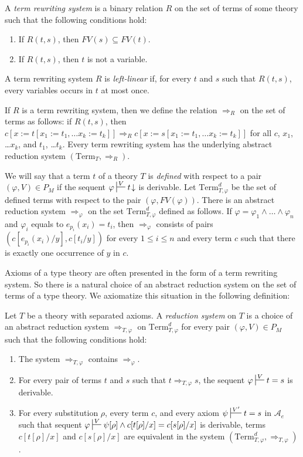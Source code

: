 \documentclass[reqno]{amsart}
\theoremstyle{definition}
\theoremstyle{remark}
\newcommand{\repl}{:=}
\newcommand{\Term}{\mathrm{Term}}
\numberwithin{figure}{section}
\begin{document}
A \emph{term rewriting system} is a binary relation $R$ on the set of terms of some theory such that the following conditions hold:
\begin{enumerate}
\item If $R(t,s)$, then $FV(s) \subseteq FV(t)$.
\item If $R(t,s)$, then $t$ is not a variable.
\end{enumerate}
A term rewriting system $R$ is \emph{left-linear} if, for every $t$ and $s$ such that $R(t,s)$, every variables occurs in $t$ at most once.

If $R$ is a term rewriting system, then we define the relation $\Rightarrow_R$ on the set of terms as follows:
if $R(t,s)$, then $c[x \repl t[x_1 \repl t_1, \ldots x_k \repl t_k]] \Rightarrow_R c[x \repl s[x_1 \repl t_1, \ldots x_k \repl t_k]]$ for all $c$, $x_1$, \ldots $x_k$, and $t_1$, \ldots $t_k$.
Every term rewriting system has the underlying abstract reduction system $(\Term_T,\Rightarrow_R)$.

We will say that a term $t$ of a theory $T$ is \emph{defined} with respect to a pair $(\varphi,V) \in P_M$ if the sequent $\varphi \sststile{}{V} t\!\downarrow$ is derivable.
Let $\Term_{T,\varphi}^d$ be the set of defined terms with respect to the pair $(\varphi,FV(\varphi))$.
There is an abstract reduction system $\Rightarrow_\varphi$ on the set $\Term_{T,\varphi}^d$ defined as follows.
If $\varphi = \varphi_1 \land \ldots \land \varphi_n$ and $\varphi_i$ equals to $e_{p_i}(x_i) = t_i$, then $\Rightarrow_\varphi$ consists of pairs $(c[e_{p_i}(x_i)/y],c[t_i/y])$
for every $1 \leq i \leq n$ and every term $c$ such that there is exactly one occurrence of $y$ in $c$.

Axioms of a type theory are often presented in the form of a term rewriting system.
So there is a natural choice of an abstract reduction system on the set of terms of a type theory.
We axiomatize this situation in the following definition:

\begin{defn}[directed]
Let $T$ be a theory with separated axioms.
A \emph{reduction system} on $T$ is a choice of an abstract reduction system $\Rightarrow_{T,\varphi}$ on $\Term^d_{T,\varphi}$ for every pair $(\varphi,V) \in P_M$ such that the following conditions hold:
\begin{enumerate}
\item \label{it:dir-zero} The system $\Rightarrow_{T,\varphi}$ contains $\Rightarrow_\varphi$.
\item \label{it:dir-first} For every pair of terms $t$ and $s$ such that $t \Rightarrow_{T,\varphi} s$, the sequent $\varphi \sststile{}{V} t = s$ is derivable.
\item \label{it:dir-second} For every substitution $\rho$, every term $c$, and every axiom $\psi \sststile{}{V'} t = s$ in $\mathcal{A}_e$
such that sequent $\varphi \sststile{}{V} \psi[\rho] \land c[t[\rho]/x] = c[s[\rho]/x]$ is derivable,
terms $c[t[\rho]/x]$ and $c[s[\rho]/x]$ are equivalent in the system $(\Term_{T,\varphi}^d,\Rightarrow_{T,\varphi})$.
\end{enumerate}
\end{defn}
\end{document}
